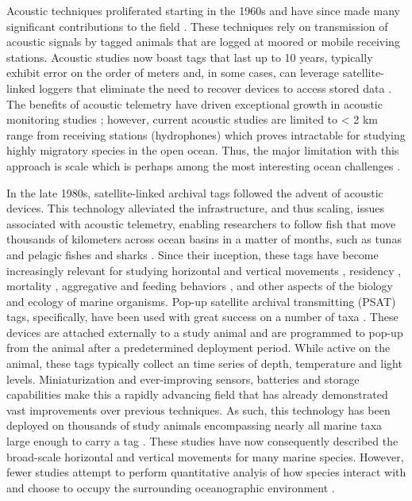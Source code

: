 Acoustic techniques proliferated starting in the 1960s and have since made many significant contributions to the field \citep[\eg][]{Carey1981, Carey1990}. These techniques rely on transmission of acoustic signals by tagged animals that are logged at moored or mobile receiving stations. Acoustic studies now boast tags that last up to 10 years, typically exhibit error on the order of meters and, in some cases, can leverage satellite-linked loggers that eliminate the need to recover devices to access stored data \citep{Donaldson2014}. The benefits of acoustic telemetry have driven exceptional growth in acoustic monitoring studies \citep{Hussey2015}; however, current acoustic studies are limited to < 2 km range from receiving stations (\eg hydrophones) which proves intractable for studying highly migratory species in the open ocean. Thus, the major limitation with this approach is scale which is perhaps among the most interesting ocean challenges \citep{Stommel1963, Haury1978}. 

In the late 1980s, satellite-linked archival tags followed the advent of acoustic devices. This technology alleviated the \is infrastructure, and thus scaling, issues associated with acoustic telemetry, enabling researchers to follow fish that move thousands of kilometers across ocean basins in a matter of months, such as tunas \citep{Block2005} and pelagic fishes and sharks \citep[\eg][]{Block2011}. Since their inception, these tags have become increasingly relevant \citep{Hussey2015} for studying horizontal and vertical movements \citep{Block2011, Thorrold2014a, Berumen2014}, residency \citep{Domeier2006}, mortality \citep{Musyl2011a}, aggregative and feeding behaviors \citep{Jorgensen2012}, and other aspects of the biology and ecology of marine organisms. Pop-up satellite archival transmitting (PSAT) tags, specifically, have been used with great success on a number of taxa \citep{Hussey2015}. These devices are attached externally to a study animal and are programmed to pop-up from the animal after a predetermined deployment period. While active on the animal, these tags typically collect an \is time series of depth, temperature and light levels. Miniaturization and ever-improving sensors, batteries and storage capabilities make this a rapidly advancing field that has already demonstrated vast improvements over previous techniques. As such, this technology has been deployed on thousands of study animals encompassing nearly all marine taxa large enough to carry a tag \citep{Hussey2015}. These studies have now consequently described the broad-scale horizontal and vertical movements for many marine species. However, fewer studies attempt to perform quantitative analyis of how species interact with and choose to occupy the surrounding oceanographic environment \citep[except see, for example, ][]{Lawson2010}.

